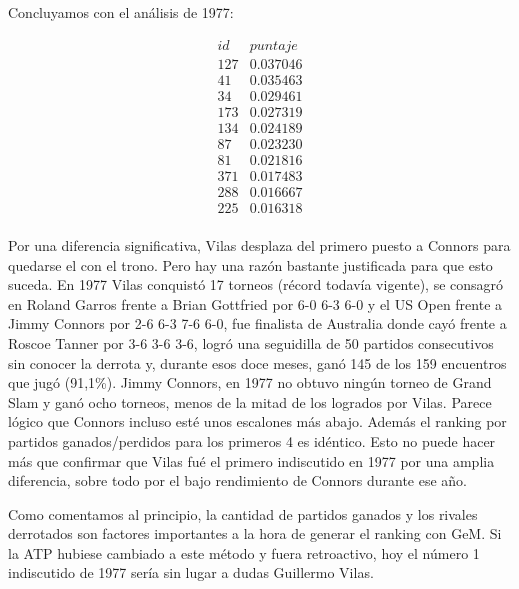 Concluyamos con el análisis de 1977: 

\begin{eqnarray*}
id & puntaje \\
127 & 0.037046 \\
41 & 0.035463 \\
34 & 0.029461 \\
173 & 0.027319 \\
134 & 0.024189 \\
87 & 0.023230 \\
81 & 0.021816 \\
371 & 0.017483 \\
288 & 0.016667 \\
225 & 0.016318 \\
\end{eqnarray*}

Por una diferencia significativa, Vilas desplaza del primero puesto a Connors para quedarse el con el trono. Pero hay una razón bastante justificada para que esto suceda.
En 1977 Vilas conquistó 17 torneos (récord todavía vigente), se consagró en Roland Garros frente a Brian Gottfried por 6-0 6-3 6-0 y el US Open frente a Jimmy Connors por 2-6 6-3 7-6 6-0, fue finalista de Australia donde cayó frente a Roscoe Tanner por 3-6 3-6 3-6, logró una seguidilla de 50 partidos consecutivos sin conocer la derrota y, durante esos doce meses, ganó 145 de los 159 encuentros que jugó (91,1\%).
Jimmy Connors, en 1977 no obtuvo ningún torneo de Grand Slam y ganó ocho torneos, menos de la mitad de los logrados por Vilas. 
Parece lógico que Connors incluso esté unos escalones más abajo. Además el ranking por partidos ganados/perdidos para los primeros 4 es idéntico. Esto no puede hacer más que confirmar que Vilas fué el primero indiscutido en 1977 por una amplia diferencia, sobre todo por el bajo rendimiento de Connors durante ese año.

Como comentamos al principio, la cantidad de partidos ganados y los rivales derrotados son factores importantes a la hora de generar el ranking con GeM. Si la ATP hubiese cambiado a este método y fuera retroactivo, hoy el número 1 indiscutido de 1977 sería sin lugar a dudas Guillermo Vilas.

